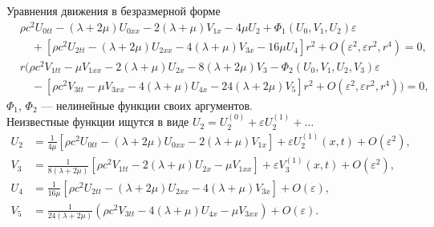 \documentclass[usenames,dvipsnames]{beamer}
\begin{document}
\begin{frame}{Уравнения движения в безразмерной форме}
\small
\begin{equation} \nonumber
\begin{split}
&\rho c^2 U_{0tt} - (\lambda + 2\mu) U_{0xx} - 2(\lambda + \mu) V_{1x} - 4\mu U_2 + \Phi_1(U_0, V_1, U_2) \varepsilon\\
&\quad+ \left[\rho c^2 U_{2tt} - (\lambda + 2\mu)U_{2xx} - 4(\lambda + \mu)V_{3x} - 16\mu U_4\right] r^2 + O(\varepsilon^2, \varepsilon r^2, r^4) = 0,
\end{split}
\end{equation}
\begin{equation} \nonumber
\begin{split}
&r \big( \rho c^2 V_{1tt} - \mu V_{1xx} - 2(\lambda + \mu)U_{2x} - 8(\lambda + 2\mu)V_3 - \Phi_2(U_0, V_1, U_2, V_3)\varepsilon \\
&\quad- \left[\rho c^2 V_{3tt} - \mu V_{3xx} - 4(\lambda + \mu)U_{4x} - 24(\lambda + 2\mu)V_5 \right] r^2  + O(\varepsilon^2, \varepsilon r^2, r^4)\big) = 0,
\end{split}
\end{equation}
\normalsize
$\Phi_1$, $\Phi_2$ --- нелинейные функции своих аргументов.\\
Неизвестные функции ищутся в виде $U_2 = U_2^{(0)} + \varepsilon U_2^{(1)} + \dots$
\small
\begin{align*}
U_2 &= \frac{1}{4\mu} \left[ \rho c^2 U_{0tt} - (\lambda + 2\mu) U_{0xx} - 2(\lambda + \mu) V_{1x} \right] + \varepsilon U_2^{(1)}(x,t) + O(\varepsilon^2),\\
V_3 &= \frac{1}{8(\lambda + 2\mu)} \left[ \rho c^2 V_{1tt} - 2(\lambda + \mu) U_{2x} - \mu V_{1xx} \right] + \varepsilon V_3^{(1)}(x,t) + O(\varepsilon^2),\\
U_4 &= \frac{1}{16\mu}\left[\rho c^2 U_{2tt} - (\lambda + 2\mu) U_{2xx} - 4(\lambda + \mu) V_{3x}\right] + O(\varepsilon),\\
V_5 &= \frac{1}{24(\lambda + 2\mu)} \left(\rho c^2 V_{3tt} - 4(\lambda+\mu)U_{4x} - \mu V_{3xx}\right) + O(\varepsilon).
\end{align*}
\end{frame}
\end{document}
